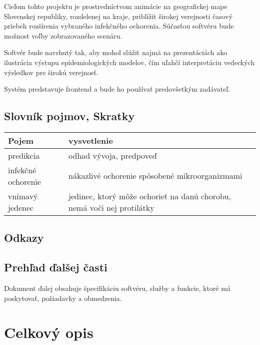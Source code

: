 \documentclass[12pt,a4paper]{report}
\begin{document}
Cieľom tohto projektu je prostredníctvom animácie na geografickej mape Slovenskej republiky, rozdelenej na kraje, priblížit širokej verejnosti časový priebeh rozšírenia vybraného infekčného ochorenia. Súčasťou softvéru bude možnost voľby zobrazovaného scenáru.  \par

Softvér bude navrhutý tak, aby mohol slúžit najmä na prezentáciách ako ilustrácia výstupu epidemiologických modelov, čím uľahčí interpretáciu vedeckých výsledkov pre širokú verejnosť.\par

Systém predstavuje frontend a bude ho používať predovšetkým zadávateľ.
\pagebreak
\section[Slovník pojmov, Skratky]{\rmfamily\bfseries
	Slovník pojmov, Skratky}	
	\begin{table}[h!]
		\centering
		\begin{tabular}{|>{\centering\arraybackslash}m{2in}|>{\centering\arraybackslash}m{1in}|}
			\hline
			\centering Pojem & vysvetlenie \\ [0ex]
			\hline
			predikcia & odhad vývoja, predpoveď \\ [0ex]
			\hline
			infekčné ochorenie & nákazlivé ochorenie spôsobené mikroorganizmami \\ [0ex]
			\hline
			vnímavý jedenec & jedinec, ktorý môže ochorieť na danú chorobu, nemá voči nej protilátky \\ [0ex]
			\hline
		\end{tabular}
	\end{table}

\section[Odkazy]{\rmfamily\bfseries
	Odkazy}

\section[Prehľad ďalšej časti]{\rmfamily\bfseries
	Prehľad ďalšej časti}
Dokument ďalej obsahuje špecifikáciu softvéru, služby a funkcie, ktoré má poskytovať, požiadavky a obmedzenia. 

\renewcommand{\chaptername}{}	
\chapter[Celkový opis]{\rmfamily\bfseries
	Celkový opis}
\end{document}
